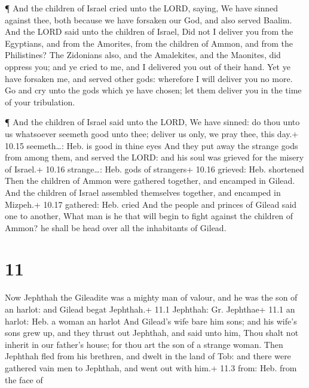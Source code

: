  ¶ And the children of Israel cried unto the LORD, saying,
We have sinned against thee, both because we have forsaken our God, and
also served Baalim.  And the LORD said unto the children of
Israel, Did not I deliver you from the Egyptians, and from the Amorites,
from the children of Ammon, and from the Philistines?  The
Zidonians also, and the Amalekites, and the Maonites, did oppress you;
and ye cried to me, and I delivered you out of their hand. 
Yet ye have forsaken me, and served other gods: wherefore I will deliver
you no more.  Go and cry unto the gods which ye have
chosen; let them deliver you in the time of your tribulation.

 ¶ And the children of Israel said unto the LORD, We have
sinned: do thou unto us whatsoever seemeth good unto thee; deliver us
only, we pray thee, this day.+ 10.15 seemeth\ldots: Heb. is good in
thine eyes  And they put away the strange gods from among
them, and served the LORD: and his soul was grieved for the misery of
Israel.+ 10.16 strange\ldots: Heb. gods of strangers+ 10.16 grieved:
Heb. shortened  Then the children of Ammon were gathered
together, and encamped in Gilead. And the children of Israel assembled
themselves together, and encamped in Mizpeh.+ 10.17 gathered: Heb. cried
 And the people and princes of Gilead said one to another,
What man is he that will begin to fight against the children of Ammon?
he shall be head over all the inhabitants of Gilead.

\hypertarget{section-10}{%
\section{11}\label{section-10}}

 Now Jephthah the Gileadite was a mighty man of valour, and
he was the son of an harlot: and Gilead begat Jephthah.+ 11.1 Jephthah:
Gr. Jephthae+ 11.1 an harlot: Heb. a woman an harlot  And
Gilead's wife bare him sons; and his wife's sons grew up, and they
thrust out Jephthah, and said unto him, Thou shalt not inherit in our
father's house; for thou art the son of a strange woman. 
Then Jephthah fled from his brethren, and dwelt in the land of Tob: and
there were gathered vain men to Jephthah, and went out with him.+ 11.3
from: Heb. from the face of

